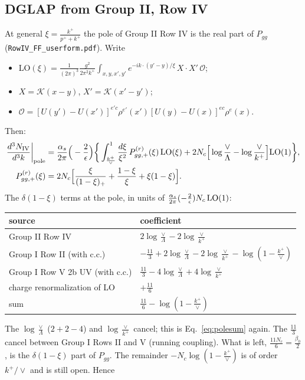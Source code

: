 \documentclass[10pt]{article}
\numberwithin{equation}{section}
\begin{document}
\subsection{DGLAP from Group II, Row IV}
At general $\xi=\frac{k^+}{p^++k^+}$ the pole of Group II Row IV is the real part of $P_{gg}$ (\texttt{RowIV\_FF\_userform.pdf}). Write
\begin{itemize}
\item LO$(\xi)=\frac{1}{(2\pi)^3}\frac{g^2}{2\pi^2k^+}\int_{x,y,x',y'}e^{-ik\cdot(y'-y)/\xi}\,X\cdot X'\,\mathcal O$;
\item $X=\mathcal K(x-y)$, $X'=\mathcal K(x'-y')$;
\item $\mathcal O=[U(y')-U(x')]^{e'c}\rho^{e'}(x')[U(y)-U(x)]^{ec}\rho^e(x)$.
\end{itemize}
Then:
\begin{align}
\frac{d^3N_{\rm IV}}{d^3k}\bigg|_{\rm pole}&=\frac{\alpha_s}{2\pi}\Big(-\frac{2}{\epsilon}\Big)\bigg\{\int_{\frac{k^+}{\vee}}^1\frac{d\xi}{\xi^2}\,P^{(r)}_{gg,+}(\xi)\,{\rm LO}(\xi)+2N_c\Big[\log\frac{\vee}{\Lambda}-\log\frac{\vee}{k^+}\Big]{\rm LO}(1)\bigg\},\\
P^{(r)}_{gg,+}(\xi)&=2N_c\Big[\frac{\xi}{(1-\xi)_+}+\frac{1-\xi}{\xi}+\xi(1-\xi)\Big].\notag
\end{align}
The $\delta(1-\xi)$ terms at the pole, in units of $\frac{\alpha_s}{2\pi}(-\frac2\epsilon)N_c\,{\rm LO}(1)$:
\begin{table}[H]\centering\small
\begin{tabular}{@{}ll@{}}\toprule
source & coefficient\\\midrule
Group II Row IV & $2\log\frac{\vee}{\Lambda}-2\log\frac{\vee}{k^+}$\\
Group I Row II (with c.c.) & $-\frac{11}{3}+2\log\frac{\vee}{\Lambda}-2\log\frac{\vee}{k^+}-\log(1-\frac{k^+}{\vee})$\\
Group I Row V 2b UV (with c.c.) & $\frac{11}{3}-4\log\frac{\vee}{\Lambda}+4\log\frac{\vee}{k^+}$\\
charge renormalization of LO & $+\frac{11}{6}$\\\midrule
sum & $\frac{11}{6}-\log(1-\frac{k^+}{\vee})$\\\bottomrule
\end{tabular}
\end{table}
\noindent The $\log\frac{\vee}{\Lambda}$ ($2+2-4$) and $\log\frac{\vee}{k^+}$ cancel; this is Eq.~\eqref{eq:polesum} again. The $\frac{11}{3}$ cancel between Group I Rows II and V (running coupling). What is left, $\frac{11N_c}{6}=\frac{\beta_0}{2}$, is the $\delta(1-\xi)$ part of $P_{gg}$. The remainder $-N_c\log(1-\frac{k^+}{\vee})$ is of order $k^+/\vee$ and is still open. Hence
\end{document}
